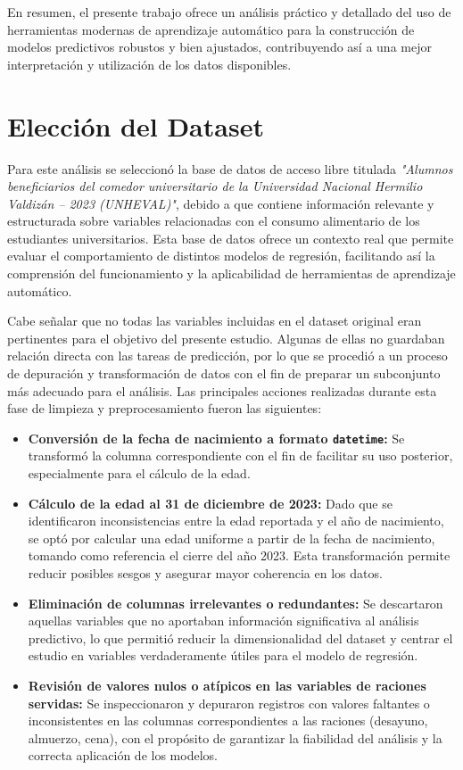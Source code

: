 \documentclass{article}
\begin{document}
En resumen, el presente trabajo ofrece un análisis práctico y detallado del uso de herramientas modernas de aprendizaje automático para la construcción de modelos predictivos robustos y bien ajustados, contribuyendo así a una mejor interpretación y utilización de los datos disponibles.


\section{Elección del Dataset}

Para este análisis se seleccionó la base de datos de acceso libre titulada \textit{"Alumnos beneficiarios del comedor universitario de la Universidad Nacional Hermilio Valdizán – 2023 (UNHEVAL)"}, debido a que contiene información relevante y estructurada sobre variables relacionadas con el consumo alimentario de los estudiantes universitarios. Esta base de datos ofrece un contexto real que permite evaluar el comportamiento de distintos modelos de regresión, facilitando así la comprensión del funcionamiento y la aplicabilidad de herramientas de aprendizaje automático.

Cabe señalar que no todas las variables incluidas en el dataset original eran pertinentes para el objetivo del presente estudio. Algunas de ellas no guardaban relación directa con las tareas de predicción, por lo que se procedió a un proceso de depuración y transformación de datos con el fin de preparar un subconjunto más adecuado para el análisis. Las principales acciones realizadas durante esta fase de limpieza y preprocesamiento fueron las siguientes:

\begin{itemize}
    \item \textbf{Conversión de la fecha de nacimiento a formato \texttt{datetime}:} Se transformó la columna correspondiente con el fin de facilitar su uso posterior, especialmente para el cálculo de la edad.
    
    \item \textbf{Cálculo de la edad al 31 de diciembre de 2023:} Dado que se identificaron inconsistencias entre la edad reportada y el año de nacimiento, se optó por calcular una edad uniforme a partir de la fecha de nacimiento, tomando como referencia el cierre del año 2023. Esta transformación permite reducir posibles sesgos y asegurar mayor coherencia en los datos.
    
    \item \textbf{Eliminación de columnas irrelevantes o redundantes:} Se descartaron aquellas variables que no aportaban información significativa al análisis predictivo, lo que permitió reducir la dimensionalidad del dataset y centrar el estudio en variables verdaderamente útiles para el modelo de regresión.
    
    \item \textbf{Revisión de valores nulos o atípicos en las variables de raciones servidas:} Se inspeccionaron y depuraron registros con valores faltantes o inconsistentes en las columnas correspondientes a las raciones (desayuno, almuerzo, cena), con el propósito de garantizar la fiabilidad del análisis y la correcta aplicación de los modelos.
\end{itemize}
\end{document}
